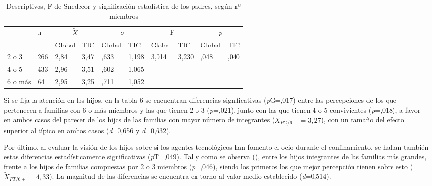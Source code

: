 \documentclass[spanish]{textolivre}
\begin{document}
\begin{table}[htpb]
\caption{Descriptivos, F de Snedecor y significación estadística de los padres, según nº miembros}
\label{tab5}
\centering
\begin{tabular}{llllllllll}
\toprule
& \multirow{2}{*}{n} & \multicolumn{2}{c}{$\tilde{X}$} & \multicolumn{2}{c}{\begin{math}\sigma\end{math}} & \multicolumn{2}{c}{F} & \multicolumn{2}{c}{\emph{p}}
\\
& & Global & TIC & Global & TIC & Global & TIC & Global & TIC
\\
\midrule
2 o 3 & 266 & 2,84 & 3,47 & ,633 & 1,198 & 3,014 & 3,230 & ,048 & ,040
\\
4 o 5 & 433 & 2,96 & 3,51 & ,602 & 1,065 & & & &
\\
6 o más & 64 & 2,95 & 3,25 & ,711 & 1,052 & & & &
\\
\bottomrule
\end{tabular}
\centering
{}
\end{table}

Si se fija la atención en los hijos, en la tabla 6 se encuentran diferencias significativas (\emph{p}G=,017) entre las percepciones de los que pertenecen a familias con 6 o más miembros y las que tienen 2 o 3 (\emph{p}=,021), junto con las que tienen 4 o 5 convivientes (\emph{p}=,018), a favor en ambos casos del parecer de los hijos de las familias con mayor número de integrantes ($\tilde{X}_{PG/6+}=3,27$), con un tamaño del efecto superior al típico en ambos casos (\emph{d}=0,656 y \emph{d}=0,632).

Por último, al evaluar la visión de los hijos sobre si los agentes tecnológicos han fomento el ocio durante el confinamiento, se hallan también estas diferencias estadísticamente significativas (\emph{p}T=,049). Tal y como se observa (), entre los hijos integrantes de las familias más grandes, frente a los hijos de familias compuestas por 2 o 3 miembros (\emph{p}=,046), siendo los primeros los que mejor percepción tienen sobre esto ($\tilde{X}_{PT/6+}=4,33$). La magnitud de las diferencias se encuentra en torno al valor medio establecido (\emph{d}=0,514).
\end{document}
